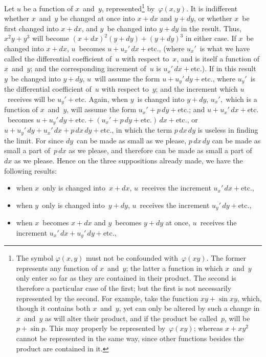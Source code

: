 \documentclass[12pt]{book}[2005/09/16]
\newcommand{\Chg}[2]{#2}
\newcommand{\Add}[1]{\Chg{}{#1}}
\renewcommand{\etc}{\text{etc}}
\renewcommand{\(}{{\upshape(}}
\renewcommand{\)}{{\upshape)}}
\newcommand{\ux}{u_{x}'}
\newcommand{\uy}{u_{y}'}
\renewcommand{\phi}{\varphi}
\begin{document}
Let $u$ be a function of $x$~and~$y$, represented\footnote
  {The symbol $\phi(x, y)$ must not be confounded with~$\phi(xy)$. The former represents
  any function of $x$~and~$y$; the latter a function in which $x$~and~$y$ only
  enter so far as they are contained in their product. The second is therefore
  a particular case of the first; but the first is not necessarily represented by
  the second. For example, take the function $xy + \sin xy$, which, though it
  contains both $x$~and~$y$, yet can only be altered by such a change in $x$~and~$y$ as
  will alter their product, and if the product be called~$p$, will be $p + \sin p$. This
  may properly be represented by~$\phi(xy)$; whereas $x + xy^{2}$ cannot be represented
  in the same way, since other functions besides the product are contained
  in it.}
by~$\phi(x, y)$.
It is indifferent whether $x$~and~$y$ be changed
%
%
at once into $x + dx$ and $y + dy$, or whether $x$~be first
changed into $x + dx$, and $y$~be changed into $y + dy$ in
the result. Thus, $x^{2} y + y^{3}$ will become $(x + dx)^{2}(y + dy) + (y + dy)^{3}$
in either case. If $x$~be changed
into $x + dx$, $u$~becomes $u + \ux\, dx + \etc.$, (where $\ux$~is
what we have called the differential coefficient of~$u$
with respect to~$x$, and is itself a function of $x$~and~$y$;
and the corresponding increment of~$u$ is $\ux\, dx + \etc.$)\Add{.}
If in this result $y$~be changed into $y + dy$, $u$~will assume
the form $u + \uy\, dy + \etc.$, where $\uy$~is the differential
coefficient of~$u$ with respect to~$y$; and the increment
which $u$~receives will be $\uy + \etc$. Again,
when $y$~is changed into $y + dy$, $\ux$,~which is a function
of $x$~and~$y$, will assume the form $\ux + p\, dy + \etc.$; and
$u + \ux\, dx + \etc.$\ becomes $u + \uy\, dy + \etc. + (\ux + p\, dy + \etc.)\, dx + \etc.$,
or $u + \uy\, dy + \ux\, dx + p\, dx\, dy + \etc.$,
in which the term $p\, dx\, dy$ is useless in finding the limit.
For since $dy$~can be made as small as we please,
$p\, dx\, dy$ can be made as small a part of~$p\, dx$ as we please,
and therefore can be made as small a part of~$dx$ as
we please. Hence on the three suppositions already
made, we have the following results:
\begin{itemize}
\item[(1)] when $x$~only is changed into~$x + dx$,
$u$~receives the increment
$\ux\, dx + \etc$.\Add{,}

\item[(2)] when $y$~only is changed into~$y + dy$,
$u$~receives the increment
$\uy\, dy + \etc$.\Add{,}

\item[(3)] when $x$~becomes $x + dx$ and $y$~becomes $y + dy$ at once,
$u$~receives the increment
$\ux\, dx + \uy\, dy + \etc$.\Add{,}
\end{itemize}
\end{document}
